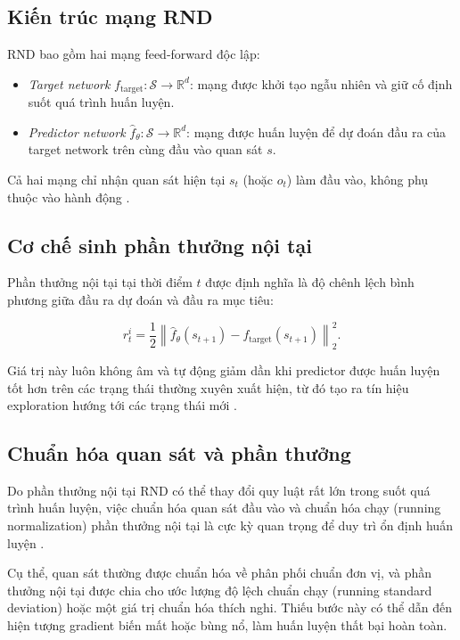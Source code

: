 \documentclass{uetgraduation}
\begin{document}
\subsection{Kiến trúc mạng RND}

RND bao gồm hai mạng feed-forward độc lập:

\begin{itemize}
    \item \textit{Target network} $f_{\text{target}}: \mathcal{S} \to \mathbb{R}^d$: mạng được khởi tạo ngẫu nhiên và giữ cố định suốt quá trình huấn luyện.
    \item \textit{Predictor network} $\hat{f}_{\theta}: \mathcal{S} \to \mathbb{R}^d$: mạng được huấn luyện để dự đoán đầu ra của target network trên cùng đầu vào quan sát $s$.
\end{itemize}

Cả hai mạng chỉ nhận quan sát hiện tại $s_t$ (hoặc $o_t$) làm đầu vào, không phụ thuộc vào hành động \cite{burda2019}.

\subsection{Cơ chế sinh phần thưởng nội tại}

Phần thưởng nội tại tại thời điểm $t$ được định nghĩa là độ chênh lệch bình phương giữa đầu ra dự đoán và đầu ra mục tiêu:

\[
r_t^i = \frac{1}{2} \left\| \hat{f}_{\theta}(s_{t+1}) - f_{\text{target}}(s_{t+1}) \right\|_2^2.
\]

Giá trị này luôn không âm và tự động giảm dần khi predictor được huấn luyện tốt hơn trên các trạng thái thường xuyên xuất hiện, từ đó tạo ra tín hiệu exploration hướng tới các trạng thái mới \cite{burda2019}.

\subsection{Chuẩn hóa quan sát và phần thưởng}

Do phần thưởng nội tại RND có thể thay đổi quy luật rất lớn trong suốt quá trình huấn luyện, việc chuẩn hóa quan sát đầu vào và chuẩn hóa chạy (running normalization) phần thưởng nội tại là cực kỳ quan trọng để duy trì ổn định huấn luyện \cite{burda2019}.

Cụ thể, quan sát thường được chuẩn hóa về phân phối chuẩn đơn vị, và phần thưởng nội tại được chia cho ước lượng độ lệch chuẩn chạy (running standard deviation) hoặc một giá trị chuẩn hóa thích nghi. Thiếu bước này có thể dẫn đến hiện tượng gradient biến mất hoặc bùng nổ, làm huấn luyện thất bại hoàn toàn.
\end{document}
